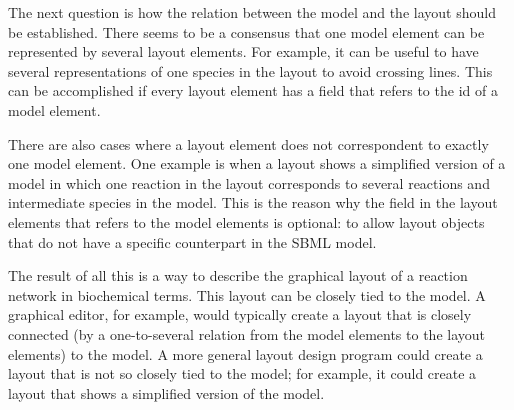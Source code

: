 The next question is how the relation between the model and the layout 
should be established. There seems to be a consensus that one model 
element can be represented by several layout elements. For example, it 
can be useful to have several representations of one species in the 
layout to avoid crossing lines. This can be accomplished if every layout 
element has a field that refers to the id of a model element. 

There are also cases where a layout element does not correspondent to 
exactly one model element. One example is when a layout shows a 
simplified version of a model in which one reaction in the layout 
corresponds to several reactions and intermediate species in the model. 
This is the reason why the field in the layout elements that refers to 
the model elements is optional: to allow layout objects that do not have 
a specific counterpart in the SBML model. 

The result of all this is a way to describe the graphical layout of a 
reaction network in biochemical terms. This layout can be closely tied 
to the model. A graphical editor, for example, would 
typically create a layout that is closely connected (by a one-to-several 
relation from the model elements to the layout elements) to the model. 
A more general layout design program could create a layout that is 
not so closely tied to the model; for example, it could create a layout 
that shows a simplified version of the model. 

